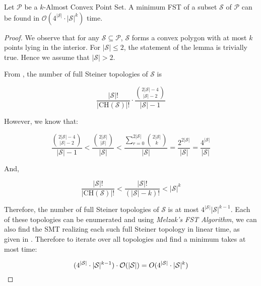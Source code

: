\begin{lemma}
\label{four_power_n}
Let $\mathcal P$ be a $k$-Almost Convex Point Set. A minimum FST of a subset $\mathcal S$ of $\mathcal P$ can be found in $\mathcal O(4^{|{\mathcal S}|} \cdot |\mathcal S| ^ k)$ time.
\end{lemma}

\begin{proof}
We observe that for any $\mathcal S \subseteq \mathcal P$, $\mathcal S$ forms a convex polygon with at most $k$ points lying in the interior. For $|{\mathcal S}| \le 2$, the statement of the lemma is trivially true. Hence we assume that $|{\mathcal S}| > 2$.

From \cite{hwang1992steiner}, the number of full Steiner topologies of $\mathcal{S}$ is 

$$\frac{|\mathcal S|!}{|\mathrm{CH}(\mathcal{S})|!} \cdot \frac {\binom{2|{\mathcal S}| - 4}{|{\mathcal S}| - 2}}{|{\mathcal S}| - 1}$$

However, we know that:

$$\frac {\binom{2|{\mathcal S}| - 4}{|{\mathcal S}| - 2}}{|{\mathcal S}| - 1} < \frac{\binom{2|{\mathcal S}|}{|{\mathcal S}|}}{|{\mathcal S}|} < \frac{\sum \limits_{r = 0}^{2|{\mathcal S}|} \binom{2|{\mathcal S}|}{k}}{|{\mathcal S}|} = \frac{2 ^{2|{\mathcal S}|}}{|{\mathcal S}|} = \frac{4^{|{\mathcal S}|}}{|{\mathcal S}|}$$

And,

$$\frac{|\mathcal S|!}{|\mathrm{CH}(\mathcal{S})|!} < \frac{|\mathcal S|!}{(|\mathcal S| - k)!} < |\mathcal S|^k$$

Therefore, the number of full Steiner topologies of $\mathcal{S}$ is at most $4^{|{\mathcal S}|} |\mathcal S| ^ {k - 1}$. Each of these topologies can be enumerated and using \emph{Melzak's FST Algorithm}, we can also find the SMT realizing each such full Steiner topology in linear time, as given in \cite{hwang1992steiner}. Therefore to iterate over all topologies and find a minimum takes at most time:

$$(4^{|{\mathcal S}|} \cdot |\mathcal S| ^ {k - 1}) \cdot \mathcal O(|\mathcal S|) = \mathcal \mathcal O(4^{|{\mathcal S}|} \cdot|\mathcal S| ^ k)$$

\end{proof}


